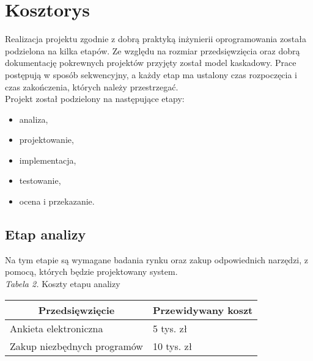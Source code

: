 \documentclass [11pt, a4paper, leqno]	{article}	%
\begin{document}
\section{Kosztorys}
\noindent
Realizacja projektu zgodnie z dobrą praktyką inżynierii oprogramowania została podzielona na kilka etapów. Ze względu na rozmiar przedsięwzięcia oraz dobrą dokumentację pokrewnych projektów przyjęty został model kaskadowy. Prace postępują w sposób sekwencyjny, a każdy etap ma ustalony czas rozpoczęcia i czas zakończenia, których należy przestrzegać. \\

Projekt został podzielony na następujące etapy:
\begin{itemize}
\item analiza,
\item projektowanie,
\item implementacja,
\item testowanie,
\item ocena i przekazanie.
\end{itemize}


\subsection{Etap analizy}
\noindent
Na tym etapie są wymagane badania rynku oraz zakup odpowiednich narzędzi, z pomocą, których będzie projektowany system. \\ 

\textit{Tabela 2.} Koszty etapu analizy
\begin{center}
	\begin{tabular}{| l | l |}
		\hline
		\multicolumn{1}{|c|}{Przedsięwzięcie} & 
		\multicolumn{1}{|c|}{Przewidywany koszt} \\ \hline \hline
		Ankieta elektroniczna & 5 tys. zł \\ \hline
		Zakup niezbędnych programów & 10 tys. zł \\ \hline
	\end{tabular}
\end{center}
\end{document}
